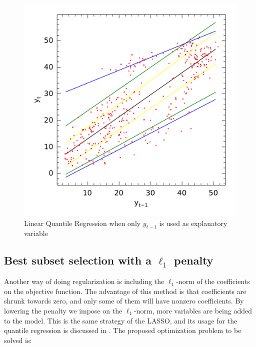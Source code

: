 \begin{figure}
\centering
\includegraphics[width=0.7\linewidth]{Figuras/npqar/icaraizinho-crossing-200}
\caption{Linear Quantile Regression when only $y_{t-1}$ is used as explanatory variable}
\label{fig:icaraizinho-crossing-200}
\end{figure}


\subsection{Best subset selection with a $\ell_1$ penalty}
\label{sec:best-subset-ell1}

Another way of doing regularization is including the $\ell_1$-norm of the coefficients on the objective function. The advantage of this method is that coefficients are shrunk towards zero, and only some of them will have nonzero coefficients. By lowering the penalty we impose on the $\ell_1$-norm, more variables are being added to the model. 
This is the same strategy of the LASSO, and its usage for the quantile regression is discussed in \cite{li2012l1}.
The proposed optimization problem to be solved is:

